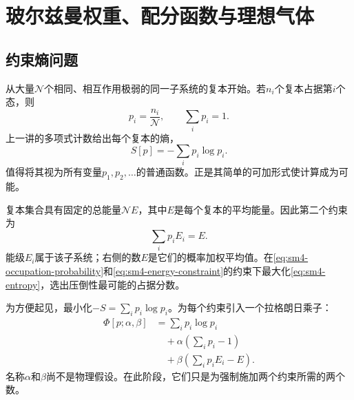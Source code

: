 \chapter{玻尔兹曼权重、配分函数与理想气体}


\section{约束熵问题}

从大量\(\mathcal N\)个相同、相互作用极弱的同一子系统的复本开始。若\(n_i\)个复本占据第\(i\)个态，则
\begin{equation}
 p_i=\frac{n_i}{\mathcal N},
 \qquad
 \sum_i p_i=1.
 \label{eq:sm4-occupation-probability}
\end{equation}
上一讲的多项式计数给出每个复本的熵，
\begin{equation}
 S[p]=-\sum_i p_i\log p_i.
 \label{eq:sm4-entropy}
\end{equation}
值得将其视为所有变量\(p_1,p_2,\ldots\)的普通函数。正是其简单的可加形式使计算成为可能。

复本集合具有固定的总能量\(\mathcal N E\)，其中\(E\)是每个复本的平均能量。因此第二个约束为
\begin{equation}
 \sum_i p_iE_i=E.
 \label{eq:sm4-energy-constraint}
\end{equation}
能级\(E_i\)属于该子系统；右侧的数\(E\)是它们的概率加权平均值。在\eqref{eq:sm4-occupation-probability}和\eqref{eq:sm4-energy-constraint}的约束下最大化\eqref{eq:sm4-entropy}，选出压倒性最可能的占据分数。

为方便起见，最小化\(-S=\sum_i p_i\log p_i\)。为每个约束引入一个拉格朗日乘子：
\begin{equation}
 \begin{aligned}
 \Phi[p;\alpha,\beta]
 &=\sum_i p_i\log p_i\\
 &\quad+\alpha\left(\sum_i p_i-1\right)\\
 &\quad+\beta\left(\sum_i p_iE_i-E\right).
 \end{aligned}
 \label{eq:sm4-augmented-functional}
\end{equation}
名称\(\alpha\)和\(\beta\)尚不是物理假设。在此阶段，它们只是为强制施加两个约束所需的两个数。

\begin{classroomqa}
\end{classroomqa}

